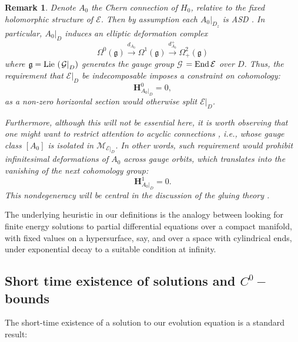\documentclass{article}
\newcommand{\func}[1]{\textnormal {#1\,}}
\newtheorem{remark}[theorem]{Remark}
\begin{document}
\begin{remark}  \label{rem deformation complex}
Denote $A_{0}$ the Chern connection of $H_{0}$, relative to the fixed holomorphic structure of $\mathcal{E}$. Then by assumption each $\left. A_{0}\right\vert _{D_{z}}
$ is ASD \cite[p.47]{4-manifolds}. In particular, $\left.
A_{0}\right\vert _{D}$ induces an elliptic deformation complex%
\begin{equation*}
\Omega ^{0}\left( \mathfrak{g}\right) \overset{d_{A_{0}}}{\rightarrow }%
\Omega ^{1}\left( \mathfrak{g}\right) \overset{d_{A_{0}}^{+}}{\rightarrow }%
\Omega _{+}^{2}\left( \mathfrak{g}\right) 
\end{equation*}%
where $\mathfrak{g}=%
\func{Lie}\left( \left. \mathcal{G}\right\vert _{D}\right) $ generates
the gauge group $\mathcal{G}$ $=\func{End}\mathcal{E}$ over $D$. Thus,
the requirement that $\mathcal{E}\vert_D$ be indecomposable imposes a constraint on cohomology: 
\begin{equation*}
        \mathbf{H}_{A_{0}\vert_D}^{0}=0,
\end{equation*}%
as a non-zero horizontal section would otherwise split $\left. \mathcal{E}\right\vert _{D}$.

Furthermore, although this will not be essential here, it is worth observing that one might want to restrict
attention to \emph{acyclic }connections \cite[p.25]{floer},
i.e., whose gauge class $\left[ A_{0}\right] $ is \emph{isolated} in $%
\mathcal{M}_{\left. \mathcal{E}\right\vert _{D}}$. In other words, such requirement would prohibit infinitesimal deformations of $A_{0}$ across gauge
orbits, which translates  into the vanishing of the next cohomology
group:%
\begin{equation*}
\mathbf{H}_{A_{0}\vert_D}^{1}=0.
\end{equation*}
This nondegeneracy will be central in the discussion of the gluing theory \cite{G2II}.
\end{remark}

The underlying heuristic in our definitions is the analogy
between looking for finite energy solutions to partial differential
equations over a compact manifold, with fixed values on a hypersurface,
say, and over a space with  cylindrical ends, under exponential decay to a suitable condition at infinity.

\subsection{\texorpdfstring
        {Short time existence of solutions and $C^{0}-$bounds}
        {Short time existence of solutions and C0-bounds}}
\label{subsec short time existence}
The short-time existence of a solution to our evolution equation is
a standard result:
\end{document}
